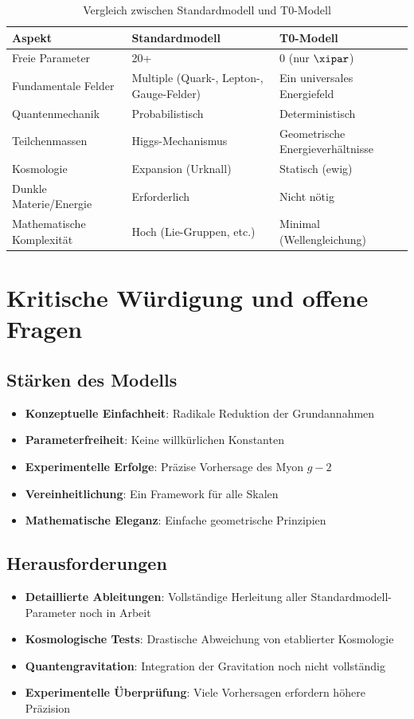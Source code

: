 	\begin{table}[H]
		\centering
		\begin{tabular}{p{5cm}p{5cm}p{5cm}}
			\toprule
			\textbf{Aspekt} & \textbf{Standardmodell} & \textbf{T0-Modell} \\
			\midrule
			Freie Parameter & 20+ & 0 (nur $\xipar$) \\
			Fundamentale Felder & Multiple (Quark-, Lepton-, Gauge-Felder) & Ein universales Energiefeld \\
			Quantenmechanik & Probabilistisch & Deterministisch \\
			Teilchenmassen & Higgs-Mechanismus & Geometrische Energieverhältnisse \\
			Kosmologie & Expansion (Urknall) & Statisch (ewig) \\
			Dunkle Materie/Energie & Erforderlich & Nicht nötig \\
			Mathematische Komplexität & Hoch (Lie-Gruppen, etc.) & Minimal (Wellengleichung) \\
			\bottomrule
		\end{tabular}
		\caption{Vergleich zwischen Standardmodell und T0-Modell}
	\end{table}
	
	\section{Kritische Würdigung und offene Fragen}
	
	\subsection{Stärken des Modells}
	
	\begin{itemize}
		\item \textbf{Konzeptuelle Einfachheit}: Radikale Reduktion der Grundannahmen
		\item \textbf{Parameterfreiheit}: Keine willkürlichen Konstanten
		\item \textbf{Experimentelle Erfolge}: Präzise Vorhersage des Myon $g-2$
		\item \textbf{Vereinheitlichung}: Ein Framework für alle Skalen
		\item \textbf{Mathematische Eleganz}: Einfache geometrische Prinzipien
	\end{itemize}
	
	\subsection{Herausforderungen}
	
	\begin{itemize}
		\item \textbf{Detaillierte Ableitungen}: Vollständige Herleitung aller Standardmodell-Parameter noch in Arbeit
		\item \textbf{Kosmologische Tests}: Drastische Abweichung von etablierter Kosmologie
		\item \textbf{Quantengravitation}: Integration der Gravitation noch nicht vollständig
		\item \textbf{Experimentelle Überprüfung}: Viele Vorhersagen erfordern höhere Präzision
	\end{itemize}
	